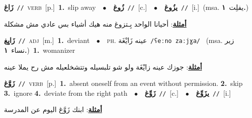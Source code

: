 \documentclass[10pt,a4paper,twoside]{article} %
\begin{document}
\begin{multicols}{2}
{\setlength\topsep{0pt}\textbf{\foreignlanguage{arabic}{زَاغ}}\ {\color{gray}\texttt{//}\color{black}}\ \textsc{verb}\ [p.]\ \textbf{1.}~slip away\ \ $\bullet$\ \ \setlength\topsep{0pt}\textbf{\foreignlanguage{arabic}{زُوغ}}\ {\color{gray}\texttt{//}\color{black}}\ [c.]\ \ $\bullet$\ \ \setlength\topsep{0pt}\textbf{\foreignlanguage{arabic}{يزُوغ}}\ {\color{gray}\texttt{//}\color{black}}\ [i.]\ \color{gray}(msa. \foreignlanguage{arabic}{يفلِت}~\foreignlanguage{arabic}{\textbf{١.}})\color{black}\  \begin{flushright}\color{gray}\foreignlanguage{arabic}{\textbf{\underline{\foreignlanguage{arabic}{أمثلة}}}: أحيانا الواحد بِـتزوغ منه هيك أشياء بس عادي مش مشكلة}\end{flushright}\color{black}} \vspace{2mm}

{\setlength\topsep{0pt}\textbf{\foreignlanguage{arabic}{زَايِغ}}\ {\color{gray}\texttt{//}\color{black}}\ \textsc{adj}\ [m.]\ \textbf{1.}~deviant\ \ $\bullet$\ \ \textsc{ph.} \color{gray} \foreignlanguage{arabic}{عينه زَايْغَة}\color{black}\ {\color{gray}\texttt{/{\sffamily ʕeːno zaːjɣa}/}\color{black}}\ \color{gray} (msa. \foreignlanguage{arabic}{زير نساء}~\foreignlanguage{arabic}{\textbf{١.}})\color{black}\ \textbf{1.}~womanizer\  \begin{flushright}\color{gray}\foreignlanguage{arabic}{\textbf{\underline{\foreignlanguage{arabic}{أمثلة}}}: جوزك عينه زايْغَة ولو شو تلبسيله وتتشخلعيله مش رح يملا عينه}\end{flushright}\color{black}} \vspace{2mm}

{\setlength\topsep{0pt}\textbf{\foreignlanguage{arabic}{زَوَّغ}}\ {\color{gray}\texttt{//}\color{black}}\ \textsc{verb}\ [p.]\ \textbf{1.}~absent oneself from an event without permission.  \textbf{2.}~skip  \textbf{3.}~ignore  \textbf{4.}~deviate from the right path\ \ $\bullet$\ \ \setlength\topsep{0pt}\textbf{\foreignlanguage{arabic}{زَوِّغ}}\ {\color{gray}\texttt{//}\color{black}}\ [c.]\ \ $\bullet$\ \ \setlength\topsep{0pt}\textbf{\foreignlanguage{arabic}{يزَوِّغ}}\ {\color{gray}\texttt{//}\color{black}}\ [i.]\  \begin{flushright}\color{gray}\foreignlanguage{arabic}{\textbf{\underline{\foreignlanguage{arabic}{أمثلة}}}: ابنك زَوَّغ اليوم عن المدرسة}\end{flushright}\color{black}} \vspace{2mm}


\end{multicols}
\end{document}
